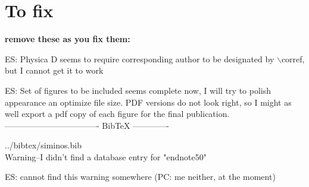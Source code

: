 
\section*{To fix}

{\bf remove these as you fix them:}

ES: Physica D seems to require corresponding author to be designated by $\backslash$corref, but I cannot get it to work

ES: Set of figures to be included seems complete now, I will try to polish appearance an optimize file size.
    PDF versions do not look right, so I might as well export a pdf copy of each figure for the final publication. 
---------------------------------- BibTeX -------------

../bibtex/siminos.bib
\\
Warning--I didn't find a database entry for "endnote50"

ES: cannot find this warning somewhere 
(PC: me neither, at the moment)
